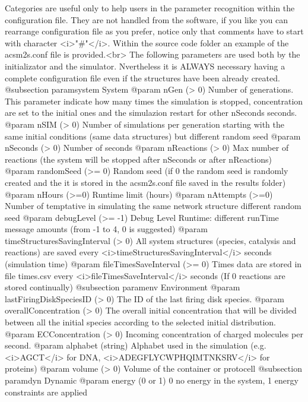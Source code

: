\begin{DoxyVerb}
          Categories are useful only to help users in the parameter recognition within the configuration file. They are not handled from the software, if you like you can rearrange configuration file as you prefer, notice only that comments have to start with character <i>"#"</i>. Within the source code folder an example of the acsm2s.conf file is provided.<br>
 The following parameters are used both by the initializator and the simulator. Nvertheless it is ALWAYS necessary having a complete configuration file even if the structures have been already created.
          @subsection paramsystem System
          @param nGen (> 0) Number of generations. This parameter indicate how many times the simulation is stopped, concentration are set to the initial ones and the simulazion restart for other nSeconds seconds.
          @param nSIM (> 0) Number of simulations per generation starting with the same initial conditions (same data structures) but different random seed
          @param nSeconds (> 0) Number of seconds
          @param nReactions (> 0) Max number of reactions (the system will be stopped after nSeconds or after nReactions)
          @param randomSeed (>= 0) Random seed (if 0 the random seed is randomly created and the it is stored in the acsm2s.conf file saved in the results folder)
          @param nHours (>=0) Runtime limit (hours)
 @param nAttempts (>=0) Number of temptative in simulating the same network structure different random seed
 @param debugLevel (>= -1) Debug Level Runtime: different runTime message amounts (from -1 to 4, 0 is suggested)
          @param timeStructuresSavingInterval (> 0) All system structures (species, catalysis and reactions) are saved every <i>timeStructuresSavingInterval</i> seconds (simulation time)
 @param fileTimesSaveInterval (>= 0) Times data are stored in file times.csv every <i>fileTimesSaveInterval</i> seconds (If 0 reactions are stored continually)
          @subsection paramenv Environment
          @param lastFiringDiskSpeciesID (> 0) The ID of the last firing disk species.
          @param overallConcentration (> 0) The overall initial concentration that will be divided between all the initial species according to the selected initial distribution.
          @param ECConcentration (> 0) Incoming concentration of charged molecules per second.
          @param alphabet (string) Alphabet used in the simulation (e.g. <i>AGCT</i> for DNA, <i>ADEGFLYCWPHQIMTNKSRV</i> for proteins)
          @param volume (> 0) Volume of the container or protocell
          @subsection paramdyn Dynamic
          @param energy (0 or 1) 0 no energy in the system, 1 energy constraints are applied

\end{DoxyVerb}
